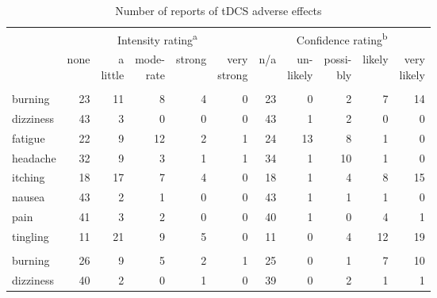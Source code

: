 \documentclass[11pt,english,]{memoir}
\begin{document}
\begingroup\fontsize{8}{10}\selectfont

\begin{longtable}{lrrrrrrrrrr}
\caption{\label{tab:tab-AB-tDCS-AE}Number of reports of tDCS adverse effects}\\
\toprule
\multicolumn{1}{c}{ } & \multicolumn{5}{c}{Intensity rating\textsuperscript{a}} & \multicolumn{5}{c}{Confidence rating\textsuperscript{b}} \\
\cmidrule(l{3pt}r{3pt}){2-6} \cmidrule(l{3pt}r{3pt}){7-11}
  & none & \makecell[c]{a\\little} & \makecell[c]{mode-\\rate} & strong & \makecell[c]{very\\strong} & n/a & \makecell[c]{un-\\likely} & \makecell[c]{possi-\\bly} & likely & \makecell[c]{very\\likely}\\
\midrule
\addlinespace[0.3em]
\multicolumn{11}{l}{\textbf{anodal session}}\\
\hspace{1em}burning & 23 & 11 & 8 & 4 & 0 & 23 & 0 & 2 & 7 & 14\\
\hspace{1em}dizziness & 43 & 3 & 0 & 0 & 0 & 43 & 1 & 2 & 0 & 0\\
\hspace{1em}fatigue & 22 & 9 & 12 & 2 & 1 & 24 & 13 & 8 & 1 & 0\\
\hspace{1em}headache & 32 & 9 & 3 & 1 & 1 & 34 & 1 & 10 & 1 & 0\\
\hspace{1em}itching & 18 & 17 & 7 & 4 & 0 & 18 & 1 & 4 & 8 & 15\\
\hspace{1em}nausea & 43 & 2 & 1 & 0 & 0 & 43 & 1 & 1 & 1 & 0\\
\hspace{1em}pain & 41 & 3 & 2 & 0 & 0 & 40 & 1 & 0 & 4 & 1\\
\hspace{1em}tingling & 11 & 21 & 9 & 5 & 0 & 11 & 0 & 4 & 12 & 19\\
\addlinespace[0.3em]
\multicolumn{11}{l}{\textbf{cathodal session}}\\
\hspace{1em}burning & 26 & 9 & 5 & 2 & 1 & 25 & 0 & 1 & 7 & 10\\
\hspace{1em}dizziness & 40 & 2 & 0 & 1 & 0 & 39 & 0 & 2 & 1 & 1\\

\end{longtable}
\end{document}
